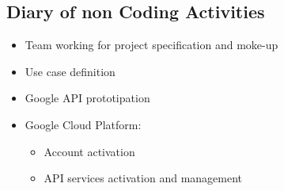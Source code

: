\documentclass{article}
\begin{document}
\subsection{Diary of non Coding Activities}
\begin{itemize}
    \item Team working for project specification and moke-up
    \item Use case definition
    \item Google API prototipation
    \item Google Cloud Platform:
    \begin{itemize}
	    \item Account activation
	    \item API services activation and management
	\end{itemize}
\end{itemize}
\end{document}
